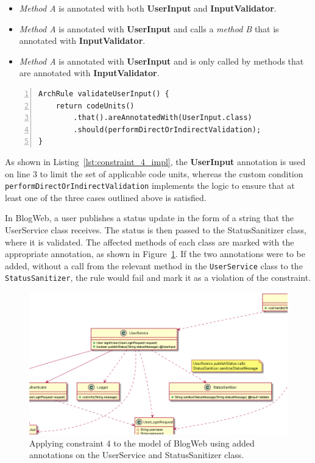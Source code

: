 \begin{itemize}
    \item \textit{Method A} is annotated with both \textbf{UserInput} and \textbf{InputValidator}.
    
    \item \textit{Method A} is annotated with \textbf{UserInput} and calls a \textit{method B} that is annotated with \textbf{InputValidator}.
    
    \item \textit{Method A} is annotated with \textbf{UserInput} and is only called by methods that are annotated with \textbf{InputValidator}.
\end{itemize}

\begin{minipage}{\linewidth}
\begin{lstlisting}[caption={Rule definition for constraint 4.}, captionpos=b, label=lst:constraint_4_impl, numbers=left]
ArchRule validateUserInput() {
    return codeUnits()
        .that().areAnnotatedWith(UserInput.class)
        .should(performDirectOrIndirectValidation);
}
\end{lstlisting}
\end{minipage}

As shown in Listing~\ref{lst:constraint_4_impl}, the \textbf{UserInput} annotation is used on line 3 to limit the set of applicable code units, whereas the custom condition \texttt{performDirectOrIndirect\-Validation} implements the logic to ensure that at least one of the three cases outlined above is satisfied.

In BlogWeb, a user publishes a status update in the form of a string that the UserService class receives. The status is then passed to the StatusSanitizer class, where it is validated. The affected methods of each class are marked with the appropriate annotation, as shown in Figure~\ref{fig:validate_input_toy_system}. If the two annotations were to be added, without a call from the relevant method in the \texttt{UserService} class to the \texttt{StatusSanitizer}, the rule would fail and mark it as a violation of the constraint.

\begin{figure}
    \centering
    \includegraphics[width=\textwidth]{figure/toyexamples/validate_input_toy_system.png}
    \caption{Applying constraint 4 to the model of BlogWeb using added annotations on the UserService and StatusSanitizer class.}
    \label{fig:validate_input_toy_system}
\end{figure}

